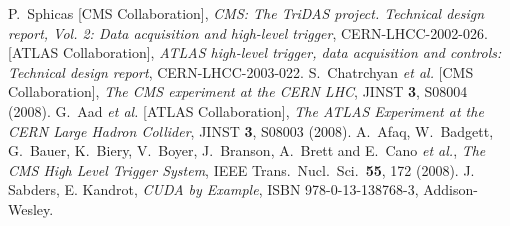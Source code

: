 \documentclass{JINST}
\begin{document}
\begin{thebibliography}{9}

%
  P.~Sphicas [CMS Collaboration],
\emph{CMS: The TriDAS project. Technical design report, Vol. 2: Data acquisition and high-level trigger},
  CERN-LHCC-2002-026.
%
%
  [ATLAS Collaboration],
\emph{ATLAS high-level trigger, data acquisition and controls: Technical design report},
  CERN-LHCC-2003-022.
%
%
  S.~Chatrchyan {\it et al.}  [CMS Collaboration],
\emph{The CMS experiment at the CERN LHC},
  JINST {\bf 3}, S08004 (2008).
%
%
  G.~Aad {\it et al.}  [ATLAS Collaboration],
\emph{The ATLAS Experiment at the CERN Large Hadron Collider},
  JINST {\bf 3}, S08003 (2008).
%
%
  A.~Afaq, W.~Badgett, G.~Bauer, K.~Biery, V.~Boyer, J.~Branson, A.~Brett and E.~Cano {\it et al.},
  \emph{The CMS High Level Trigger System},
  IEEE Trans.\ Nucl.\ Sci.\  {\bf 55}, 172 (2008).
%
J. Sabders, E. Kandrot,
\emph{CUDA by Example},
ISBN 978-0-13-138768-3, Addison-Wesley.


\end{thebibliography}
\end{document}
